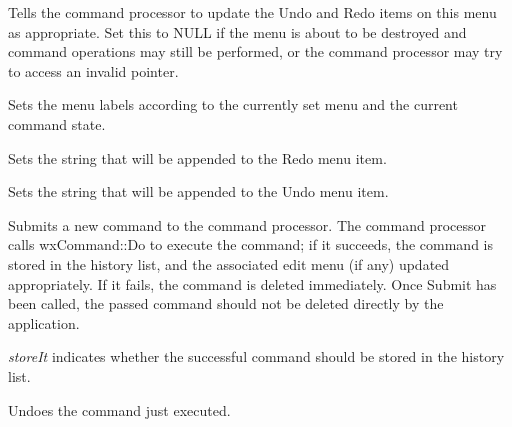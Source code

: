 \label{wxcommandprocessorseteditmenu}


Tells the command processor to update the Undo and Redo items on this
menu as appropriate. Set this to NULL if the menu is about to be
destroyed and command operations may still be performed, or the command
processor may try to access an invalid pointer.

\label{wxcommandprocessorsetmenustrings}


Sets the menu labels according to the currently set menu and the current
command state.

\label{wxcommandprocessorsetredoaccelerator}


Sets the string that will be appended to the Redo menu item.

\label{wxcommandprocessorsetundoaccelerator}


Sets the string that will be appended to the Undo menu item.

\label{wxcommandprocessorsubmit}


Submits a new command to the command processor. The command processor
calls wxCommand::Do to execute the command; if it succeeds, the command
is stored in the history list, and the associated edit menu (if any) updated
appropriately. If it fails, the command is deleted
immediately. Once Submit has been called, the passed command should not
be deleted directly by the application.

{\it storeIt} indicates whether the successful command should be stored
in the history list.

\label{wxcommandprocessorundo}


Undoes the command just executed.


